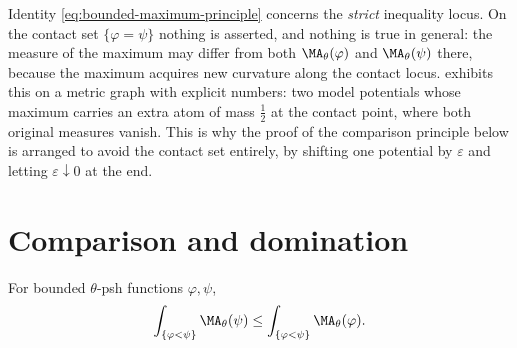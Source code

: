 \begin{remark}
\label{rem:ch25-max-sets}
Identity \eqref{eq:bounded-maximum-principle} concerns the \emph{strict}
inequality locus.  On the contact set \(\{\varphi=\psi\}\) nothing is
asserted, and nothing is true in general: the measure of the maximum may
differ from both \(\MA_\theta(\varphi)\) and \(\MA_\theta(\psi)\) there,
because the maximum acquires new curvature along the contact locus.
 exhibits this on a metric graph with
explicit numbers: two model potentials whose maximum carries an extra atom
of mass \(\tfrac12\) at the contact point, where both original measures
vanish.  This is why the proof of the comparison
principle below is arranged to avoid the contact set entirely, by shifting
one potential by \(\varepsilon\) and letting \(\varepsilon\downarrow0\) at
the end.
\end{remark}

\section{Comparison and domination}
\label{sec:ch25-comparison}

\begin{corollary}
\label{cor:bounded-comparison-principle}
For bounded \(\theta\)-psh functions \(\varphi,\psi\),
\begin{equation}
\label{eq:bounded-comparison-principle}
       \int_{\{\varphi<\psi\}}\MA_\theta(\psi)
       \leq
       \int_{\{\varphi<\psi\}}\MA_\theta(\varphi).
\end{equation}
\end{corollary}

